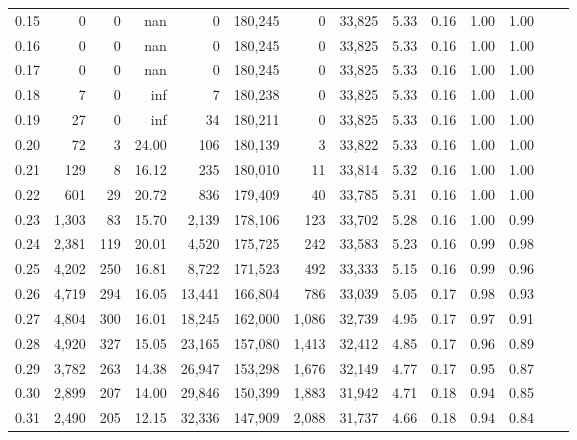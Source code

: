 \begin{tabular}{rrrrrrrrrrrrrr}
0.15 &      0 &      0 &     nan &        0 &  180,245 &       0 &  33,825 &  5.33 &  0.16 &  1.00 &      1.00 \\
0.16 &      0 &      0 &     nan &        0 &  180,245 &       0 &  33,825 &  5.33 &  0.16 &  1.00 &      1.00 \\
0.17 &      0 &      0 &     nan &        0 &  180,245 &       0 &  33,825 &  5.33 &  0.16 &  1.00 &      1.00 \\
0.18 &      7 &      0 &     inf &        7 &  180,238 &       0 &  33,825 &  5.33 &  0.16 &  1.00 &      1.00 \\
0.19 &     27 &      0 &     inf &       34 &  180,211 &       0 &  33,825 &  5.33 &  0.16 &  1.00 &      1.00 \\
0.20 &     72 &      3 &   24.00 &      106 &  180,139 &       3 &  33,822 &  5.33 &  0.16 &  1.00 &      1.00 \\
0.21 &    129 &      8 &   16.12 &      235 &  180,010 &      11 &  33,814 &  5.32 &  0.16 &  1.00 &      1.00 \\
0.22 &    601 &     29 &   20.72 &      836 &  179,409 &      40 &  33,785 &  5.31 &  0.16 &  1.00 &      1.00 \\
0.23 &  1,303 &     83 &   15.70 &    2,139 &  178,106 &     123 &  33,702 &  5.28 &  0.16 &  1.00 &      0.99 \\
0.24 &  2,381 &    119 &   20.01 &    4,520 &  175,725 &     242 &  33,583 &  5.23 &  0.16 &  0.99 &      0.98 \\
0.25 &  4,202 &    250 &   16.81 &    8,722 &  171,523 &     492 &  33,333 &  5.15 &  0.16 &  0.99 &      0.96 \\
0.26 &  4,719 &    294 &   16.05 &   13,441 &  166,804 &     786 &  33,039 &  5.05 &  0.17 &  0.98 &      0.93 \\
0.27 &  4,804 &    300 &   16.01 &   18,245 &  162,000 &   1,086 &  32,739 &  4.95 &  0.17 &  0.97 &      0.91 \\
0.28 &  4,920 &    327 &   15.05 &   23,165 &  157,080 &   1,413 &  32,412 &  4.85 &  0.17 &  0.96 &      0.89 \\
0.29 &  3,782 &    263 &   14.38 &   26,947 &  153,298 &   1,676 &  32,149 &  4.77 &  0.17 &  0.95 &      0.87 \\
0.30 &  2,899 &    207 &   14.00 &   29,846 &  150,399 &   1,883 &  31,942 &  4.71 &  0.18 &  0.94 &      0.85 \\
0.31 &  2,490 &    205 &   12.15 &   32,336 &  147,909 &   2,088 &  31,737 &  4.66 &  0.18 &  0.94 &      0.84 \\

\end{tabular}

